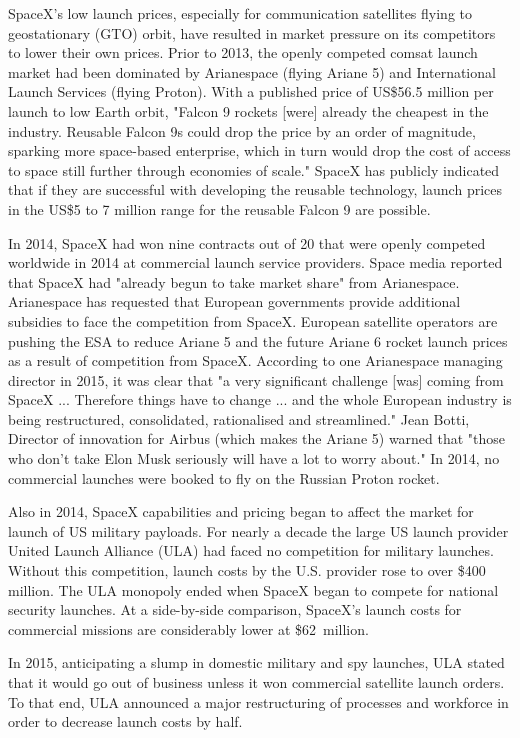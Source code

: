 SpaceX's low launch prices, especially for communication satellites
flying to geostationary (GTO) orbit, have resulted in market pressure on
its competitors to lower their own prices. Prior to 2013, the openly
competed comsat launch market had been dominated by Arianespace (flying
Ariane 5) and International Launch Services (flying Proton). With a
published price of US\$56.5 million per launch to low Earth orbit,
"Falcon 9 rockets {[}were{]} already the cheapest in the industry.
Reusable Falcon 9s could drop the price by an order of magnitude,
sparking more space-based enterprise, which in turn would drop the cost
of access to space still further through economies of scale." SpaceX has
publicly indicated that if they are successful with developing the
reusable technology, launch prices in the US\$5 to 7 million range for
the reusable Falcon 9 are possible.

In 2014, SpaceX had won nine contracts out of 20 that were openly
competed worldwide in 2014 at commercial launch service providers. Space
media reported that SpaceX had "already begun to take market share" from
Arianespace. Arianespace has requested that European governments provide
additional subsidies to face the competition from SpaceX. European
satellite operators are pushing the ESA to reduce Ariane 5 and the
future Ariane 6 rocket launch prices as a result of competition from
SpaceX. According to one Arianespace managing director in 2015, it was
clear that "a very significant challenge {[}was{]} coming from SpaceX
... Therefore things have to change ... and the whole European industry
is being restructured, consolidated, rationalised and streamlined." Jean
Botti, Director of innovation for Airbus (which makes the Ariane 5)
warned that "those who don't take Elon Musk seriously will have a lot to
worry about." In 2014, no commercial launches were booked to fly on the
Russian Proton rocket.

Also in 2014, SpaceX capabilities and pricing began to affect the market
for launch of US military payloads. For nearly a decade the large US
launch provider United Launch Alliance (ULA) had faced no competition
for military launches. Without this competition, launch costs by the
U.S. provider rose to over \$400 million. The ULA monopoly ended when
SpaceX began to compete for national security launches. At a
side-by-side comparison, SpaceX's launch costs for commercial missions
are considerably lower at \$62~million.

In 2015, anticipating a slump in domestic military and spy launches, ULA
stated that it would go out of business unless it won commercial
satellite launch orders. To that end, ULA announced a major
restructuring of processes and workforce in order to decrease launch
costs by half.

